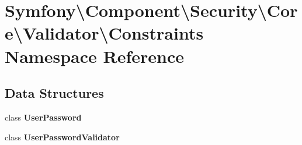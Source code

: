 \section{Symfony\textbackslash{}Component\textbackslash{}Security\textbackslash{}Core\textbackslash{}Validator\textbackslash{}Constraints Namespace Reference}
\label{namespace_symfony_1_1_component_1_1_security_1_1_core_1_1_validator_1_1_constraints}
\subsection*{Data Structures}
\begin{DoxyCompactItemize}
\item 
class {\bf User\+Password}
\item 
class {\bf User\+Password\+Validator}
\end{DoxyCompactItemize}
